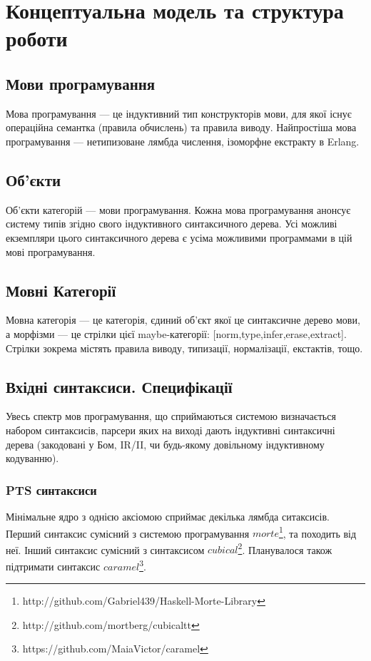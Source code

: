 \chapter{Концептуальна модель та структура роботи}

\section{Мови програмування}
Мова програмування --- це індуктивний тип конструкторів мови,
для якої існує операційна семантка (правила обчислень) та правила виводу.
Найпростіша мова програмування --- нетипизоване лямбда числення,
ізоморфне екстракту в Erlang.

\section{Об'єкти}
Об'єкти категорій --- мови програмування. Кожна мова програмування
анонсує систему типів згідно свого індуктивного синтаксичного дерева.
Усі можливі екземпляри цього синтаксичного дерева є усіма
можливими программами в цій мові програмування.

\section{Мовні Категорії}
Мовна категорія --- це категорія, єдиний об’єкт якої це
синтаксичне дерево мови, а морфізми --- це стрілки
цієї maybe-категорії: [norm,type,infer,erase,extract]. Стрілки
зокрема містять правила виводу, типизації, нормалізації, екстактів, тощо.

\section{Вхідні синтаксиси. Специфікації}
Увесь спектр мов програмування, що сприймаються системою визначається набором
синтаксисів, парсери яких на виході дають індуктивні синтаксичні дерева
(закодовані у Бом, IR/II, чи будь-якому довільному індуктивному кодуванню).

\subsection{PTS синтаксиси}
Мінімальне ядро з однією аксіомою сприймає декілька лямбда ситаксисів.
Перший синтаксис сумісний з системою програмування
$morte$\footnote{http://github.com/Gabriel439/Haskell-Morte-Library}, та походить від неї.
Інший синтаксис сумісний з синтаксисом $cubical$\footnote{http://github.com/mortberg/cubicaltt}.
Планувалося також підтримати синтаксис $caramel$\footnote{https://github.com/MaiaVictor/caramel}.

